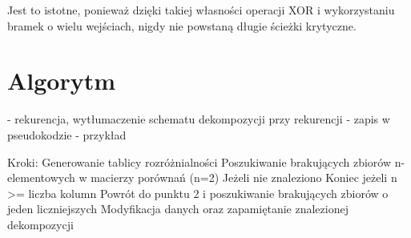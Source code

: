 Jest to istotne,
ponieważ dzięki takiej własności operacji XOR i wykorzystaniu bramek o wielu wejściach,
nigdy nie powstaną długie ścieżki krytyczne.

\section{Algorytm}
- rekurencja, wytłumaczenie schematu dekompozycji przy rekurencji
- zapis w pseudokodzie
- przykład

Kroki:
Generowanie tablicy rozróżnialności
Poszukiwanie brakujących zbiorów n-elementowych w macierzy porównań (n=2)
Jeżeli nie znaleziono
Koniec jeżeli n >= liczba kolumn
Powrót do punktu 2 i poszukiwanie brakujących zbiorów o jeden liczniejszych
Modyfikacja danych oraz zapamiętanie znalezionej dekompozycji
